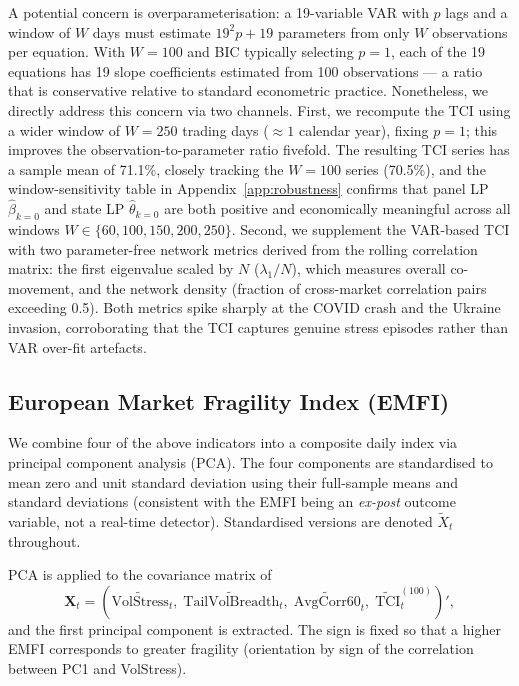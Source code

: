\documentclass[11pt]{article}
\begin{document}
A potential concern is overparameterisation: a 19-variable VAR with $p$ lags
and a window of $W$ days must estimate $19^2 p + 19$ parameters from only $W$
observations per equation.
With $W = 100$ and BIC typically selecting $p = 1$, each of the 19 equations
has 19 slope coefficients estimated from 100 observations --- a ratio that is
conservative relative to standard econometric practice.
Nonetheless, we directly address this concern via two channels.
First, we recompute the TCI using a wider window of $W = 250$ trading days
(${\approx}1$ calendar year), fixing $p = 1$; this improves the
observation-to-parameter ratio fivefold.
The resulting TCI series has a sample mean of 71.1\%, closely tracking the
$W = 100$ series (70.5\%), and the window-sensitivity table in
Appendix~\ref{app:robustness} confirms that panel LP $\hat\beta_{k=0}$ and
state LP $\hat\theta_{k=0}$ are both positive and economically meaningful
across all windows $W \in \{60, 100, 150, 200, 250\}$.
Second, we supplement the VAR-based TCI with two parameter-free network metrics
derived from the rolling correlation matrix: the first eigenvalue scaled by $N$
($\lambda_1/N$), which measures overall co-movement, and the network density
(fraction of cross-market correlation pairs exceeding 0.5).
Both metrics spike sharply at the COVID crash and the Ukraine invasion,
corroborating that the TCI captures genuine stress episodes rather than
VAR over-fit artefacts.

\subsection{European Market Fragility Index (EMFI)}
\label{subsec:emfi}

We combine four of the above indicators into a composite daily index via
principal component analysis (PCA).
The four components are standardised to mean zero and unit standard deviation
using their full-sample means and standard deviations (consistent with the
EMFI being an \emph{ex-post} outcome variable, not a real-time detector).
Standardised versions are denoted $\tilde{X}_t$ throughout.

PCA is applied to the covariance matrix of
\begin{equation}
  \mathbf{X}_t = (\widetilde{\text{VolStress}}_t,\;
                  \widetilde{\text{TailVolBreadth}}_t,\;
                  \widetilde{\text{AvgCorr60}}_t,\;
                  \widetilde{\text{TCI}}_{t}^{(100)})',
\end{equation}
and the first principal component is extracted.
The sign is fixed so that a higher EMFI corresponds to greater fragility
(orientation by sign of the correlation between PC1 and VolStress).
\end{document}
